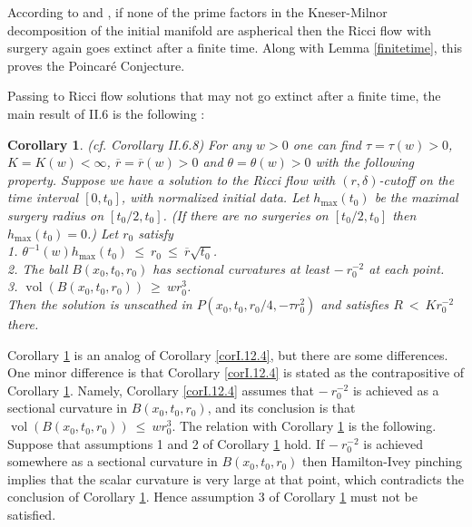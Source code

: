 \documentclass[12pt]{amsart}
\newcommand{\vol}{\operatorname{vol}}
\numberwithin{equation}{section}
\theoremstyle{plain}
\newtheorem{corollary}[equation]{Corollary}
\theoremstyle{definition}
\theoremstyle{remark}
\begin{document}
According to \cite{Colding-Minicozzi,Colding-Minicozzi2} and 
\cite{Perelman3}, if 
none of the prime factors in the Kneser-Milnor decomposition of
the initial manifold are aspherical
then the Ricci flow with surgery again goes extinct
after a finite time.
Along with Lemma \ref{finitetime}, this proves the
Poincar\'e Conjecture.

Passing to Ricci flow solutions that may not go extinct after a finite time,
the main result of II.6 is the following :

\begin{corollary} \label{II.6.8}
(cf. Corollary II.6.8) For any $w > 0$ one can find
$\tau = \tau(w) > 0$, $K = K(w) < \infty$,
$\overline{r} = \overline{r}(w) > 0$ and $\theta = \theta(w) > 0$ with
the following property. Suppose we have a solution to the Ricci flow
with $(r, \delta)$-cutoff on the time interval $[0, t_0]$, with
normalized initial data.  
Let $h_{\max}(t_0)$ be the maximal surgery radius on $[t_0/2, t_0]$.
(If there are no surgeries on $[t_0/2, t_0]$ then $h_{\max}(t_0) = 0$.) 
Let $r_0$ satisfy \\
1. $\theta^{-1}(w) h_{\max}(t_0) \: \le \: r_0 \: \le \: 
\overline{r} \sqrt{t_0}$.\\
2. The ball $B(x_0, t_0, r_0)$ has sectional curvatures at least
$- \: r_0^{-2}$ at each point.\\
3. $\vol(B(x_0, t_0, r_0)) \: \ge \: w r_0^3$.\\

Then the solution is unscathed in $P(x_0, t_0, r_0/4, - \tau r_0^2)$
and satisfies $R \: < \: Kr_0^{-2}$ there.
\end{corollary}

Corollary \ref{II.6.8} is an analog of Corollary \ref{corI.12.4}, but there
are some differences.  One minor difference is that Corollary \ref{corI.12.4} is
stated as the contrapositive of Corollary \ref{II.6.8}. Namely,
Corollary \ref{corI.12.4} assumes that $- \: r_0^{-2}$ is achieved as a sectional
curvature in $B(x_0, t_0, r_0)$, and its conclusion is that
$\vol(B(x_0, t_0, r_0)) \: \le \: w r_0^3$. The relation
with Corollary \ref{II.6.8} is the following. Suppose that 
assumptions 1 and 2 of Corollary \ref{II.6.8} hold. If
$- \: r_0^{-2}$ is achieved somewhere as a sectional
curvature in $B(x_0, t_0, r_0)$ then Hamilton-Ivey pinching implies
that the scalar curvature is very large at that point, 
which contradicts the conclusion
of Corollary \ref{II.6.8}. Hence assumption 3 of Corollary \ref{II.6.8}
must not be satisfied.
\end{document}
